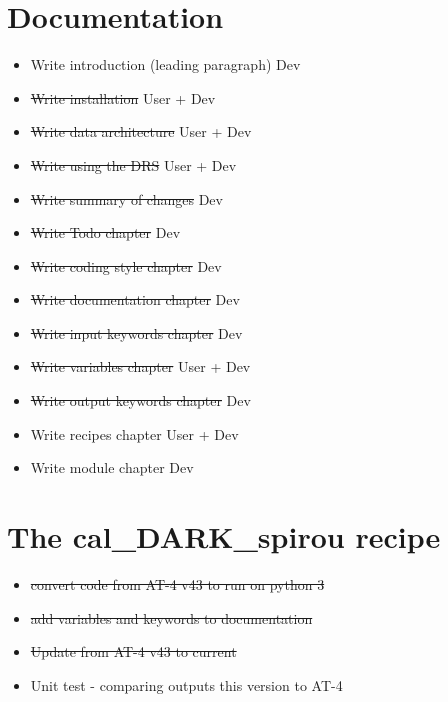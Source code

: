 \section{Documentation}
\label{ch:todo:documentation}

\begin{itemize}
	\item Write introduction (leading paragraph) \dotfill Dev
	\item \sout{Write installation} \dotfill User + Dev
	\item \sout{Write data architecture} \dotfill User + Dev
	\item \sout{Write using the DRS} \dotfill User + Dev
	\item \sout{Write summary of changes} \dotfill Dev
	\item \sout{Write Todo chapter} \dotfill Dev
	\item \sout{Write coding style chapter} \dotfill Dev
	\item \sout{Write documentation chapter} \dotfill Dev
	\item \sout{Write input keywords chapter} \dotfill Dev
	\item \sout{Write variables chapter} \dotfill User + Dev
	\item \sout{Write output keywords chapter} \dotfill Dev
	\item Write recipes chapter \dotfill User + Dev
	\item Write module chapter \dotfill Dev
\end{itemize}


\section{The cal\_DARK\_spirou recipe}
\label{ch:todo:cal_DARK_spirou}

\begin{itemize}
	\item \sout{convert code from AT-4 v43 to run on python 3}
	\item \sout{add variables and keywords to documentation}
	\item \sout{Update from AT-4 v43 to current}
	\item Unit test - comparing outputs this version to AT-4
\end{itemize}

